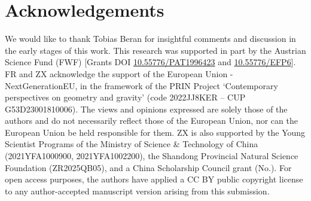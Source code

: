 \documentclass[hidelinks,12pt,a4paper]{article}
\numberwithin{equation}{section}
\theoremstyle{plain}
\theoremstyle{definition}
\begin{document}
\section*{Acknowledgements}
\setcounter{equation}{0}
We would like to thank Tobias Beran for insightful comments and discussion in the early stages of this work. 
This research was supported in part by the Austrian Science Fund (FWF) [Grants DOI \href{https://doi.org/10.55776/PAT1996423}{10.55776/PAT1996423} and \href{https://doi.org/10.55776/EFP6}{10.55776/EFP6}]. 
FR and ZX acknowledge the support of the European Union - NextGenerationEU, in the framework of the PRIN Project `Contemporary perspectives on geometry and gravity' (code 2022JJ8KER – CUP G53D23001810006). The views and opinions expressed are solely those of the authors and do not necessarily reflect those of the European Union, nor can the European Union be held responsible for them. 
ZX is also supported by the Young Scientist Programs of the Ministry of Science \& Technology of China (2021YFA1000900, 2021YFA1002200), the Shandong Provincial Natural Science Foundation (ZR2025QB05), and a China Scholarship Council grant (No.).
For open access purposes, the authors have applied a CC BY public copyright license to any author-accepted manuscript version arising from this submission.


 

\end{document}
